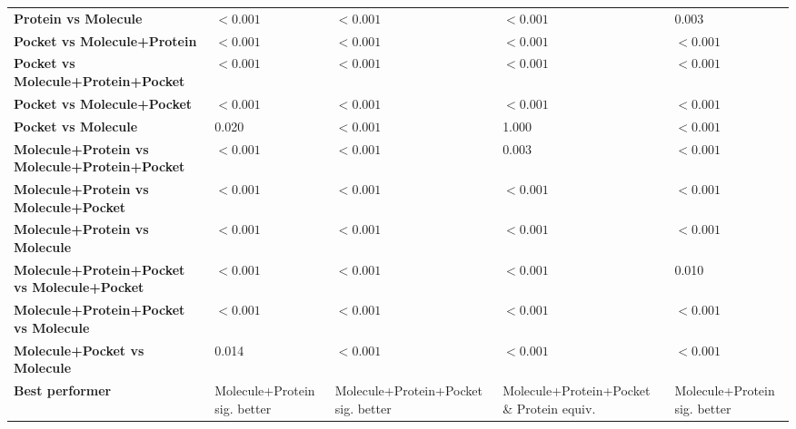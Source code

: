 \begin{table}[H]
{\begin{tabular}{lllll}
        \textbf{Protein vs Molecule} & $< 0.001$ & $< 0.001$ & $< 0.001$ & 0.003 \\
        \textbf{Pocket vs Molecule+Protein} & $< 0.001$ & $< 0.001$ & $< 0.001$ & $< 0.001$ \\
        \textbf{Pocket vs Molecule+Protein+Pocket} & $< 0.001$ & $< 0.001$ & $< 0.001$ & $< 0.001$ \\
        \textbf{Pocket vs Molecule+Pocket} & $< 0.001$ & $< 0.001$ & $< 0.001$ & $< 0.001$ \\
        \textbf{Pocket vs Molecule} & 0.020 & $< 0.001$ & 1.000 & $< 0.001$ \\
        \textbf{Molecule+Protein vs Molecule+Protein+Pocket} & $< 0.001$ & $< 0.001$ & 0.003 & $< 0.001$ \\
        \textbf{Molecule+Protein vs Molecule+Pocket} & $< 0.001$ & $< 0.001$ & $< 0.001$ & $< 0.001$ \\
        \textbf{Molecule+Protein vs Molecule} & $< 0.001$ & $< 0.001$ & $< 0.001$ & $< 0.001$ \\
        \textbf{Molecule+Protein+Pocket vs Molecule+Pocket} & $< 0.001$ & $< 0.001$ & $< 0.001$ & 0.010 \\
        \textbf{Molecule+Protein+Pocket vs Molecule} & $< 0.001$ & $< 0.001$ & $< 0.001$ & $< 0.001$ \\
        \textbf{Molecule+Pocket vs Molecule} & 0.014 & $< 0.001$ & $< 0.001$ & $< 0.001$ \\
        \textbf{Best performer} & Molecule+Protein sig. better & Molecule+Protein+Pocket sig. better & Molecule+Protein+Pocket \& Protein equiv. & Molecule+Protein sig. better \\
        \bottomrule
    \end{tabular}}
\end{table}